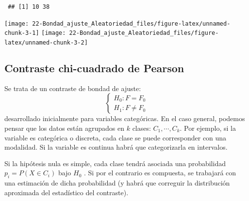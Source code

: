 \documentclass[
]{book}
\theoremstyle{break}
\theoremstyle{nonumberplain}
\begin{document}
\begin{verbatim}
 ## [1] 10 38
\end{verbatim}

\begin{center}\texttt{[image: 22-Bondad\_ajuste\_Aleatoriedad\_files/figure-latex/unnamed-chunk-3-1]} \texttt{[image: 22-Bondad\_ajuste\_Aleatoriedad\_files/figure-latex/unnamed-chunk-3-2]} \end{center}

\hypertarget{chi2test}{%
\subsection{Contraste chi-cuadrado de Pearson}\label{chi2test}}

Se trata de un contraste de bondad de ajuste:
\[\left \{
\begin{array}{l}
H_0:F=F_0\\
H_1:F\neq F_0\end{array}
\right.\]
desarrollado inicialmente para variables categóricas. En el caso general, podemos pensar que los datos están agrupados en \(k\) clases: \(C_1,\cdots,C_{k}\). Por ejemplo, si la variable es categórica o discreta, cada clase se puede corresponder con una modalidad. Si la variable es continua habrá que categorizarla en intervalos.

Si la hipótesis nula es simple, cada clase tendrá asociada una probabilidad \(p_{i}=P\left( X\in C_{i} \right)\) bajo \(H_0\) . Si por el contrario es compuesta, se trabajará con una estimación de dicha probabilidad (y habrá que correguir la distribución aproximada del estadístico del contraste).
\end{document}
